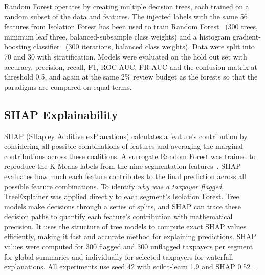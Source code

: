 Random Forest operates by creating multiple decision trees, each trained on a random subset of the data and features. The injected labels with the same 56 features from Isolation Forest has been used to train Random Forest~\cite{breiman2001random} (300 trees, minimum leaf three, balanced-subsample class weights) and a histogram gradient-boosting classifier~\cite{friedman2001greedy,pedregosa2011scikit} (300 iterations, balanced class weights). Data were split into 70 and 30 with stratification. Models were evaluated on the hold out set with accuracy, precision, recall, F1, ROC-AUC, PR-AUC and the confusion matrix at threshold 0.5, and again at the same 2\% review budget as the forests so that the paradigms are compared on equal terms.

\subsection{SHAP Explainability}

SHAP (SHapley Additive exPlanations) calculates a feature's contribution by considering all possible combinations of features and averaging the marginal contributions across these coalitions. A surrogate Random Forest was trained to reproduce the K-Means labels from the nine segmentation features~\cite{craven1995extracting}. SHAP evaluates how much each feature contributes to the final prediction across all possible feature combinations. To identify \textit{why was a taxpayer flagged}, TreeExplainer was applied directly to each segment's Isolation Forest. Tree models make decisions through a series of splits, and SHAP can trace these decision paths to quantify each feature's contribution with mathematical precision. It uses the structure of tree models to compute exact SHAP values efficiently, making it fast and accurate method for explaining predictions. SHAP values were computed for 300 flagged and 300 unflagged taxpayers per segment for global summaries and individually for selected taxpayers for waterfall explanations. All experiments use seed 42 with scikit-learn 1.9 and SHAP 0.52~\cite{pedregosa2011scikit}.
